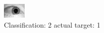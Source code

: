\begin{figure}[h!]
\begin{center}
\includegraphics[width=0.60\columnwidth]{figures/ID1459_class_2_target_1.png}
\end{center}
\caption{ Classification: 2 actual target: 1}
\label{fig:ID1459_class_2_target_1}
\end{figure}
